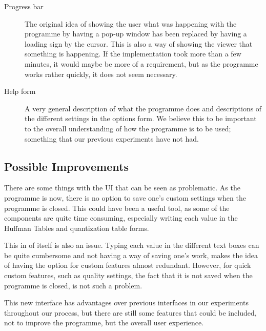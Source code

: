 \begin{description}
\item[Progress bar]
The original idea of showing the user what was happening with the programme by having a pop-up window has been replaced by having a loading sign by the cursor. This is also a way of showing the viewer that something is happening. If the implementation took more than a few minutes, it would maybe be more of a requirement, but as the programme works rather quickly, it does not seem necessary.

\item[Help form]
A very general description of what the programme does and descriptions of the different settings in the options form. We believe this to be important to the overall understanding of how the programme is to be used; something that our previous experiments have not had.
\end{description}

\subsection{Possible Improvements}
There are some things with the UI that can be seen as problematic. As the programme is now, there is no option to save one's custom settings when the programme is closed. This could have been a useful tool, as some of the components are quite time consuming, especially writing each value in the Huffman Tables and quantization table forms.

This in of itself is also an issue. Typing each value in the different text boxes can be quite cumbersome and not having a way of saving one's work, makes the idea of having the option for custom features almost redundant. However, for quick custom features, such as quality settings, the fact that it is not saved when the programme is closed, is not such a problem.

This new interface has advantages over previous interfaces in our experiments throughout our process, but there are still some features that could be included, not to improve the programme, but the overall user experience.


